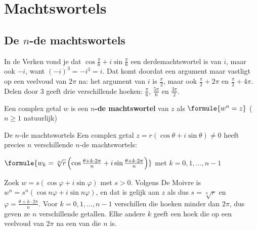 \begin{oefeningen}
\end{oefeningen}

\section{Machtswortels}

\subsection{De \texorpdfstring{$n$}{n}-de machtswortels}

In de Verken vond je dat $\cos\frac{\pi}{6} + i\sin\frac{\pi}{6}$ een derdemachtswortel is van $i$, maar ook $-i$, want $(-i)^3 = -i^3 = i$. Dat komt doordat een argument maar vastligt op een veelvoud van $2\pi$ na: het argument van $i$ is $\frac{\pi}{2}$, maar ook $\frac{\pi}{2} + 2\pi$ en $\frac{\pi}{2} + 4\pi$. Delen door 3 geeft drie verschillende hoeken: $\frac{\pi}{6}$, $\frac{5\pi}{6}$ en $\frac{3\pi}{2}$.

\begin{theorie}
Een complex getal $w$ is een \textbf{\textcolor{accent}{$n$-de machtswortel}} van $z$ als \quad $\formule{w^n = z}$ \qquad ($n \geqslant 1$ natuurlijk)

\begin{stelling}{De $n$-de machtswortels}
Een complex getal $z = r(\cos\theta + i\sin\theta) \neq 0$ heeft precies $n$ verschillende $n$-de machtswortels:

\vspace{1mm}
\qquad $\formule{w_k = \sqrt[n]{r}\,\Bigl(\cos\frac{\theta + k \cdot 2\pi}{n} + i\sin\frac{\theta + k \cdot 2\pi}{n}\Bigr)}$ \qquad met $k = 0, 1, \ldots, n - 1$
\end{stelling}

\begin{bewijs}
Zoek $w = s(\cos\varphi + i\sin\varphi)$ met $s > 0$. Volgens De Moivre is $w^n = s^n(\cos n\varphi + i\sin n\varphi)$, en dat is gelijk aan $z$ als
dus $s = \sqrt[n]{r}$ en $\varphi = \frac{\theta + k \cdot 2\pi}{n}$. Voor $k = 0, 1, \ldots, n - 1$ verschillen die hoeken minder dan $2\pi$, dus geven ze $n$ verschillende getallen. Elke andere $k$ geeft een hoek die op een veelvoud van $2\pi$ na een van die $n$ is.
\end{bewijs}
\end{theorie}

